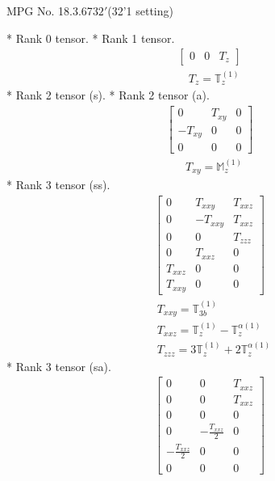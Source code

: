 \documentclass[fleqn,8pt,landscape]{jsarticle}
\begin{document}
\setcounter{MaxMatrixCols}{32}

\renewcommand{\tablename}{Table~}
\renewcommand{\figurename}{Figure~}
\begin{center}
\LARGE
MPG No. 18.3.67\quad$32'$\quad(32'1 setting)
\end{center}
* Rank 0 tensor.
* Rank 1 tensor.
\begin{align*}
\begin{bmatrix} 0 & 0 & T_{z} \end{bmatrix}
\end{align*}
\begin{align*}
& T_{z} = \mathbb{T}_{z}^{(1)}
\end{align*}
* Rank 2 tensor (s).
* Rank 2 tensor (a).
\begin{align*}
\begin{bmatrix} 0 & T_{xy} & 0 \\ - T_{xy} & 0 & 0 \\ 0 & 0 & 0 \end{bmatrix}
\end{align*}
\begin{align*}
& T_{xy} = \mathbb{M}_{z}^{(1)}
\end{align*}
* Rank 3 tensor (ss).
\begin{align*}
\begin{bmatrix} 0 & T_{xxy} & T_{xxz} \\ 0 & - T_{xxy} & T_{xxz} \\ 0 & 0 & T_{zzz} \\ 0 & T_{xxz} & 0 \\ T_{xxz} & 0 & 0 \\ T_{xxy} & 0 & 0 \end{bmatrix}
\end{align*}
\begin{align*}
& T_{xxy} = \mathbb{T}_{3b}^{(1)} \\
& T_{xxz} = \mathbb{T}_{z}^{(1)} - \mathbb{T}_{z}^{\alpha(1)} \\
& T_{zzz} = 3 \mathbb{T}_{z}^{(1)} + 2 \mathbb{T}_{z}^{\alpha(1)}
\end{align*}
* Rank 3 tensor (sa).
\begin{align*}
\begin{bmatrix} 0 & 0 & T_{xxz} \\ 0 & 0 & T_{xxz} \\ 0 & 0 & 0 \\ 0 & - \frac{T_{xxz}}{2} & 0 \\ - \frac{T_{xxz}}{2} & 0 & 0 \\ 0 & 0 & 0 \end{bmatrix}
\end{align*}
\end{document}
